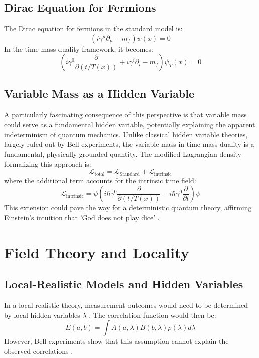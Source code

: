 \documentclass[12pt,a4paper]{article}
\newcommand{\Tfield}{T(x)}
\begin{document}
	\subsection{Dirac Equation for Fermions}
	The Dirac equation for fermions in the standard model is:
	\begin{equation}
		(i\gamma^\mu\partial_\mu - m_f) \psi(x) = 0
	\end{equation}
	In the time-mass duality framework, it becomes:
	\begin{equation}
		\left(i\gamma^0\frac{\partial}{\partial(t/\Tfield)} + i\gamma^i\partial_i - m_f\right) \psi_T(x) = 0
	\end{equation}
	
	\subsection{Variable Mass as a Hidden Variable}
	A particularly fascinating consequence of this perspective is that variable mass could serve as a fundamental hidden variable, potentially explaining the apparent indeterminism of quantum mechanics. Unlike classical hidden variable theories, largely ruled out by Bell experiments, the variable mass in time-mass duality is a fundamental, physically grounded quantity.
	The modified Lagrangian density formalizing this approach is:
	\begin{equation}
		\mathcal{L}_\text{total} = \mathcal{L}_\text{Standard} + \mathcal{L}_\text{intrinsic}
	\end{equation}
	where the additional term accounts for the intrinsic time field:
	\begin{equation}
		\mathcal{L}_\text{intrinsic} = \bar{\psi}\left(i\hbar\gamma^0 \frac{\partial}{\partial (t/\Tfield)} - i\hbar\gamma^0 \frac{\partial}{\partial t}\right)\psi
	\end{equation}
	This extension could pave the way for a deterministic quantum theory, affirming Einstein’s intuition that 'God does not play dice' \cite{Pascher2024}\relax.
	
	\section{Field Theory and Locality}
	\subsection{Local-Realistic Models and Hidden Variables}
	In a local-realistic theory, measurement outcomes would need to be determined by local hidden variables \(\lambda\) \cite{Bell1964}\relax. The correlation function would then be:
	\begin{equation}
		E(a,b) = \int A(a,\lambda)B(b,\lambda)\rho(\lambda)d\lambda
	\end{equation}
	However, Bell experiments show that this assumption cannot explain the observed correlations \cite{Aspect1982}\relax.
	
\end{document}
